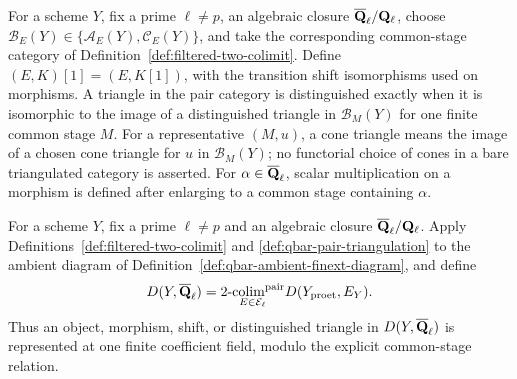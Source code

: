 
\begin{definition}
\label{def:qbar-pair-triangulation}


For a scheme \(Y\), fix a prime \(\ell\neq p\), an algebraic closure
\(\overline{\mathbf Q}_\ell/\mathbf Q_{\ell}\), choose
\(\mathcal B_E(Y)\in\{\mathcal A_E(Y),\mathcal C_E(Y)\}\), and take the
corresponding common-stage category of
Definition~\ref{def:filtered-two-colimit}.
Define \((E,K)[1]=(E,K[1])\), with the transition shift isomorphisms used
on morphisms.  A triangle in the pair category is distinguished exactly
when it is isomorphic to the image of a distinguished triangle in
\(\mathcal B_M(Y)\) for one finite common stage \(M\).  For a representative
\((M,u)\), a cone triangle means the image of a chosen cone triangle for
\(u\) in \(\mathcal B_M(Y)\); no functorial choice of cones in a bare
triangulated category is asserted.  For \(\alpha\in\overline{\mathbf Q}_\ell\), scalar
multiplication on a morphism is defined after enlarging to a common stage
containing \(\alpha\).
\end{definition}


\begin{definition}
\label{def:qbar-ambient-derived-category}


For a scheme \(Y\), fix a prime \(\ell\neq p\) and an algebraic closure
\(\overline{\mathbf Q}_\ell/\mathbf Q_{\ell}\).  Apply Definitions~\ref{def:filtered-two-colimit} and
\ref{def:qbar-pair-triangulation} to the ambient diagram of
Definition~\ref{def:qbar-ambient-finext-diagram}, and define
\[
 D(Y,\overline{\mathbf Q}_\ell)=
 \underset{E\in\mathcal E_\ell}{\operatorname{2-colim}^{\mathrm{pair}}}
 D(Y_{\mathrm{proet}},E_Y).
\]
Thus an object, morphism, shift, or distinguished triangle in
\(D(Y,\overline{\mathbf Q}_\ell)\) is represented at one finite coefficient field, modulo the
explicit common-stage relation.
\end{definition}


